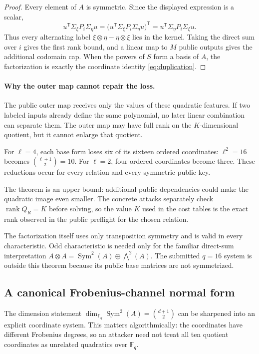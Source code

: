\documentclass[11pt]{article}
\newcommand{\F}{\mathbb F}
\newcommand{\Sym}{\operatorname{Sym}}
\newcommand{\rank}{\operatorname{rank}}
\newcommand{\transpose}{\mathsf T}
\begin{document}
\begin{proof}
Every element of $A$ is symmetric.  Since the displayed expression is a
scalar,
\[
 u^\transpose\Sigma_\xi P_i\Sigma_\eta u
 =\bigl(u^\transpose\Sigma_\xi P_i\Sigma_\eta u\bigr)^\transpose
 =u^\transpose\Sigma_\eta P_i\Sigma_\xi u.
\]
Thus every alternating label $\xi\otimes\eta-\eta\otimes\xi$ lies in the
kernel.  Taking the direct sum over $i$ gives the first rank bound, and a
linear map to $M$ public outputs gives the additional codomain cap.  When the
powers of $S$ form a basis of $A$, the factorization is exactly the coordinate
identity \eqref{eq:duplication}.
\end{proof}

\paragraph{Why the outer map cannot repair the loss.}
The public outer map receives only the values of these quadratic features.  If
two labeled inputs already define the same polynomial, no later linear
combination can separate them.  The outer map may have full rank on the
$K$-dimensional quotient, but it cannot enlarge that quotient.

For $\ell=4$, each base form loses six of its sixteen ordered coordinates:
$\ell^2=16$ becomes $\binom{\ell+1}{2}=10$.  For $\ell=2$, four ordered
coordinates become three.  These reductions occur for every relation and every
symmetric public key.

The theorem is an upper bound: additional public dependencies could make the
quadratic image even smaller.  The concrete attacks separately check
$\rank Q_R=K$ before solving, so the value $K$ used in the cost tables is the
exact rank observed in the public preflight for the chosen relation.

The factorization itself uses only transposition symmetry and is valid in every
characteristic.  Odd characteristic is needed only for the familiar direct-sum
interpretation
$A\otimes A=\Sym^2(A)\oplus\bigwedge^2(A)$.  The submitted $q=16$ system is
outside this theorem because its public base matrices are not symmetrized.

\subsection{A canonical Frobenius-channel normal form}
\label{sec:frobenius-channels}

The dimension statement $\dim_{\F_q}\Sym^2(A)=\binom{d+1}{2}$ can be sharpened
into an explicit coordinate system.  This matters algorithmically: the
coordinates have different Frobenius degrees, so an attacker need not treat all
ten quotient coordinates as unrelated quadratics over $\F_q$.
\end{document}
